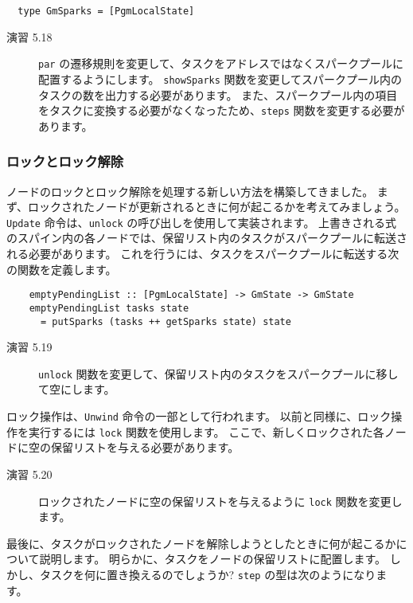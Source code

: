 \documentclass{jarticle}
\begin{document}
\begin{verbatim}
  type GmSparks = [PgmLocalState]
\end{verbatim}

\begin{description}
	\item[演習 5.18] \texttt{par} の遷移規則を変更して、タスクをアドレスではなくスパークプールに配置するようにします。
		\texttt{showSparks} 関数を変更してスパークプール内のタスクの数を出力する必要があります。
		また、スパークプール内の項目をタスクに変換する必要がなくなったため、\texttt{steps} 関数を変更する必要があります。
\end{description}

\subsubsection{ロックとロック解除}

ノードのロックとロック解除を処理する新しい方法を構築してきました。
まず、ロックされたノードが更新されるときに何が起こるかを考えてみましょう。
\texttt{Update} 命令は、\texttt{unlock} の呼び出しを使用して実装されます。
上書きされる式のスパイン内の各ノードでは、保留リスト内のタスクがスパークプールに転送される必要があります。
これを行うには、タスクをスパークプールに転送する次の関数を定義します。

\begin{verbatim}
    emptyPendingList :: [PgmLocalState] -> GmState -> GmState
    emptyPendingList tasks state
      = putSparks (tasks ++ getSparks state) state
\end{verbatim}

\begin{description}
	\item[演習 5.19] \texttt{unlock} 関数を変更して、保留リスト内のタスクをスパークプールに移して空にします。
\end{description}

ロック操作は、\texttt{Unwind} 命令の一部として行われます。
以前と同様に、ロック操作を実行するには \texttt{lock} 関数を使用します。
ここで、新しくロックされた各ノードに空の保留リストを与える必要があります。

\begin{description}
	\item[演習 5.20] ロックされたノードに空の保留リストを与えるように \texttt{lock} 関数を変更します。
\end{description}

最後に、タスクがロックされたノードを解除しようとしたときに何が起こるかについて説明します。
明らかに、タスクをノードの保留リストに配置します。
しかし、タスクを何に置き換えるのでしょうか?
\texttt{step} の型は次のようになります。
\end{document}

